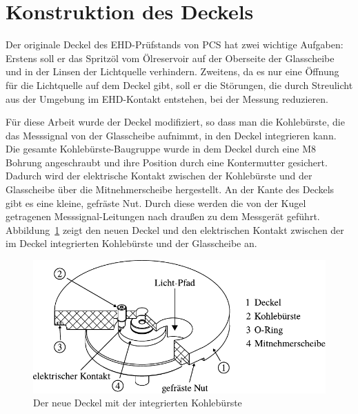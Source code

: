 \section{Konstruktion des Deckels}
\label{sec:konstruktion_des_deckels}

Der originale Deckel des EHD-Prüfstands von PCS hat zwei wichtige Aufgaben:
Erstens soll er das Spritzöl vom Ölreservoir auf der Oberseite der Glasscheibe und in der Linsen der Lichtquelle verhindern.
Zweitens, da es nur eine Öffnung für die Lichtquelle auf dem Deckel gibt, soll er die Störungen, die durch Streulicht aus der Umgebung im EHD-Kontakt entstehen, bei der Messung reduzieren.

Für diese Arbeit wurde der Deckel modifiziert, so dass man die Kohlebürste, die das Messsignal von der Glasscheibe aufnimmt, in den Deckel integrieren kann.
Die gesamte Kohlebürste-Baugruppe wurde in dem Deckel durch eine M8 Bohrung angeschraubt und ihre Position durch eine Kontermutter gesichert.
Dadurch wird der elektrische Kontakt zwischen der Kohlebürste und der Glasscheibe über die Mitnehmerscheibe hergestellt.
An der Kante des Deckels gibt es eine kleine, gefräste Nut.
Durch diese werden die von der Kugel getragenen Messsignal-Leitungen nach draußen zu dem Messgerät geführt.
Abbildung~\ref{fig:deckel_mit_kohlebuersten} zeigt den neuen Deckel und den elektrischen Kontakt zwischen der im Deckel integrierten Kohlebürste und der Glasscheibe an.

\begin{figure}[htb]
    \centering
    \includegraphics[]{./images/deckel_und_scheibe.pdf}
    \caption{Der neue Deckel mit der integrierten Kohlebürste}
    \label{fig:deckel_mit_kohlebuersten}
\end{figure}
